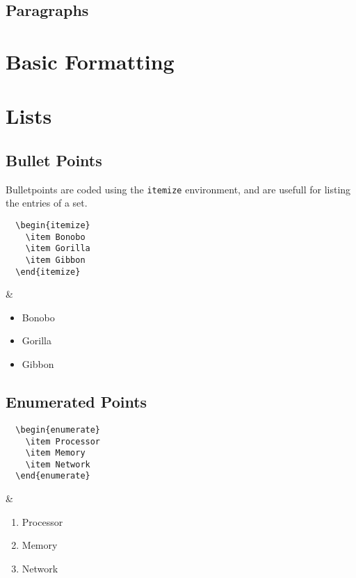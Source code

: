 

\subsection{Paragraphs}

\section{Basic Formatting}

\section{Lists}
\subsection{Bullet Points}

Bulletpoints are coded using the \texttt{itemize} environment, and are usefull for listing the entries of a set.

\begin{latexdemo}
  \begin{verbatim}
  \begin{itemize}
    \item Bonobo
    \item Gorilla
    \item Gibbon
  \end{itemize}
  \end{verbatim}
  &
  \begin{itemize}
    \item Bonobo
    \item Gorilla
    \item Gibbon
  \end{itemize}
\end{latexdemo}

\subsection{Enumerated Points}

\begin{latexdemo}
  \begin{verbatim}
  \begin{enumerate}
    \item Processor
    \item Memory
    \item Network
  \end{enumerate}
  \end{verbatim}
  &
  \begin{enumerate}
    \item Processor
    \item Memory
    \item Network
  \end{enumerate}
\end{latexdemo}

